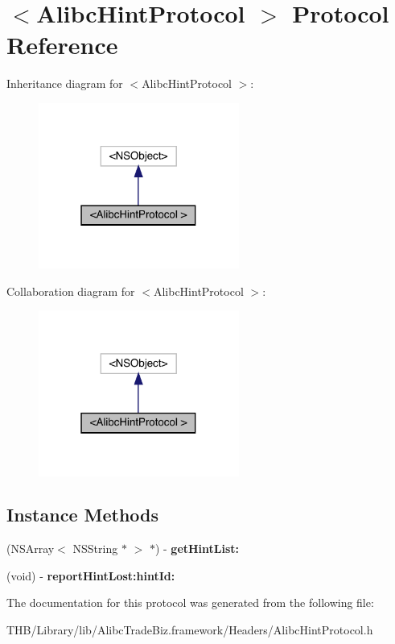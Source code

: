 \hypertarget{protocol_alibc_hint_protocol_01-p}{}\section{$<$Alibc\+Hint\+Protocol $>$ Protocol Reference}
\label{protocol_alibc_hint_protocol_01-p}


Inheritance diagram for $<$Alibc\+Hint\+Protocol $>$\+:\nopagebreak
\begin{figure}[H]
\begin{center}
\leavevmode
\includegraphics[width=187pt]{protocol_alibc_hint_protocol_01-p__inherit__graph}
\end{center}
\end{figure}


Collaboration diagram for $<$Alibc\+Hint\+Protocol $>$\+:\nopagebreak
\begin{figure}[H]
\begin{center}
\leavevmode
\includegraphics[width=187pt]{protocol_alibc_hint_protocol_01-p__coll__graph}
\end{center}
\end{figure}
\subsection*{Instance Methods}
\begin{DoxyCompactItemize}
\item 
\mbox{\label{protocol_alibc_hint_protocol_01-p_a27c04f2d16e6ac5e7bd3225430640afc}} 
(N\+S\+Array$<$ N\+S\+String $\ast$ $>$ $\ast$) -\/ {\bfseries get\+Hint\+List\+:}
\item 
\mbox{\label{protocol_alibc_hint_protocol_01-p_ac17932289f5b9feb1c7bf1111070b474}} 
(void) -\/ {\bfseries report\+Hint\+Lost\+:hint\+Id\+:}
\end{DoxyCompactItemize}


The documentation for this protocol was generated from the following file\+:\begin{DoxyCompactItemize}
\item 
T\+H\+B/\+Library/lib/\+Alibc\+Trade\+Biz.\+framework/\+Headers/Alibc\+Hint\+Protocol.\+h\end{DoxyCompactItemize}
